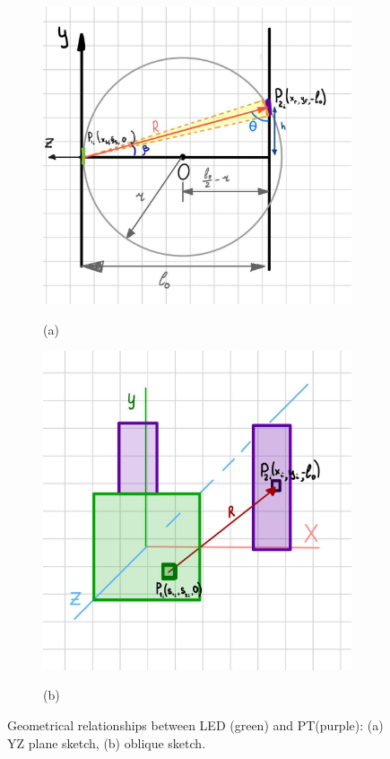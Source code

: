 \begin{figure}[H]
  \centering
  \begin{subfigure}[b]{0.3\textwidth}
    \includegraphics[width=\textwidth]{figs/simplified_model_notebook.jpg}
    \label{fig:sketch_ZY}
      \caption*{(a)}
    \end{subfigure}
  \begin{subfigure}[b]{0.32\textwidth}
      \includegraphics[width=\textwidth]{figs/oblique_draft.jpg}
      \label{fig:sketch_oblique}
      \caption*{(b)}
  \end{subfigure}
  \caption{Geometrical relationships between LED (green) and PT(purple): (a) YZ plane sketch, (b) oblique sketch.}
  \label{fig:LED_PT_scetch}
\end{figure}

